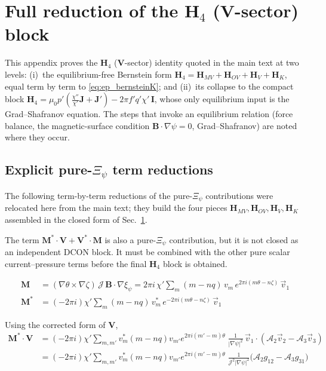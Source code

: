 \documentclass[10pt,a4paper]{article}
\numberwithin{equation}{section}
\begin{document}
\clearpage
\appendix

\section{Full reduction of the $\mathbf H_4$ ($\mathbf V$-sector) block}\label{app:h4}

This appendix proves the $\mathbf H_4$ ($\mathbf V$-sector) identity quoted in
the main text at two levels: (i)~the equilibrium-free Bernstein form
$\mathbf H_4=\mathbf H_{MV}+\mathbf H_{OV}+\mathbf H_V+\mathbf H_K$, equal term by
term to \eqref{eq:ep_bernsteinK}; and (ii)~its collapse to the compact block
$\mathbf H_4=\mu_0p'\!\left(\tfrac{\chi''}{\chi'}\mathbf J+\mathbf J'\right)-2\pi
f'q'\chi'\,\mathbf I$, whose only equilibrium input is the Grad--Shafranov
equation.  The steps that invoke an equilibrium relation (force balance, the
magnetic-surface condition $\mathbf B\cdot\nabla\psi=0$, Grad--Shafranov) are
noted where they occur.

\subsection{Explicit pure-$\Xi_\psi$ term reductions}\label{app:reductions}

The following term-by-term reductions of the pure-$\Xi_\psi$ contributions
were relocated here from the main text; they build the four pieces
$\mathbf H_{MV},\mathbf H_{OV},\mathbf H_V,\mathbf H_K$ assembled in the
closed form of Sec.~\ref{app:h4}.

The term $\mathbf M^*\cdot\mathbf V+\mathbf V^*\cdot\mathbf M$ is also a
pure-$\Xi_\psi$ contribution, but it is not closed as an independent DCON
block.  It must be combined with the other pure scalar current--pressure terms
before the final $\mathbf H_4$ block is obtained.

\begin{align}
\mathbf M
&=
(\nabla\theta\times\nabla\zeta)\,\mathcal J\,\mathbf B\cdot\nabla\xi_\psi=
2\pi i\,\chi'
\sum_m (m-nq)\,v_m\,e^{2\pi i(m\theta-n\zeta)}\,\vec v_1 \\
\mathbf M^*&=
(-2\pi i)\chi'
\sum_m (m-nq)\,v_m^*\,e^{-2\pi i(m\theta-n\zeta)}\,\vec v_1
\end{align}

Using the corrected form of $\mathbf V$,
\begin{align}
\mathbf M^*\cdot\mathbf V
&=
(-2\pi i)\chi'
\sum_{m,m'}
v_m^*(m-nq)v_{m'}
e^{2\pi i(m'-m)\theta}
\;
\frac{1}{|\nabla\psi|^2}\,
\vec v_1\cdot(\mathcal A_2\vec v_2-\mathcal A_3\vec v_3) \\
&=
(-2\pi i)\chi'
\sum_{m,m'}
v_m^*(m-nq)v_{m'}
e^{2\pi i(m'-m)\theta}
\;
\frac{1}{\mathcal J^2|\nabla\psi|^2}
\big(
\mathcal A_2 g_{12}-\mathcal A_3 g_{31}
\big)
\end{align}
\end{document}
